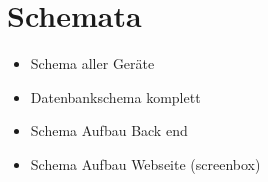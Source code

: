 \section{Schemata}

\begin{itemize}
	\item Schema aller Geräte
	\item Datenbankschema komplett
	\item Schema Aufbau Back end
	\item Schema Aufbau Webseite (screenbox)
\end{itemize}
